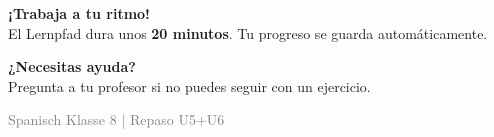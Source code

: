 \documentclass[11pt, a4paper]{article}
\begin{document}
\vspace{1em}


\begin{tcolorbox}[
    colback=erfolg!10,
    colframe=erfolg,
    boxrule=1.5pt,
    arc=0pt
]
\textbf{\textcolor{erfolg}{¡Trabaja a tu ritmo!}}\\[0.3em]
El Lernpfad dura unos \textbf{20 minutos}. Tu progreso se guarda automáticamente.
\end{tcolorbox}

\vspace{1em}


\begin{tcolorbox}[
    colback=warnung-hell,
    colframe=warnung,
    boxrule=1.5pt,
    arc=0pt
]
\textbf{\textcolor{warnung}{¿Necesitas ayuda?}}\\[0.3em]
Pregunta a tu profesor si no puedes seguir con un ejercicio.
\end{tcolorbox}

\vfill


\begin{center}
\textcolor{gray}{\small Spanisch Klasse 8 | Repaso U5+U6}
\end{center}
\end{document}
